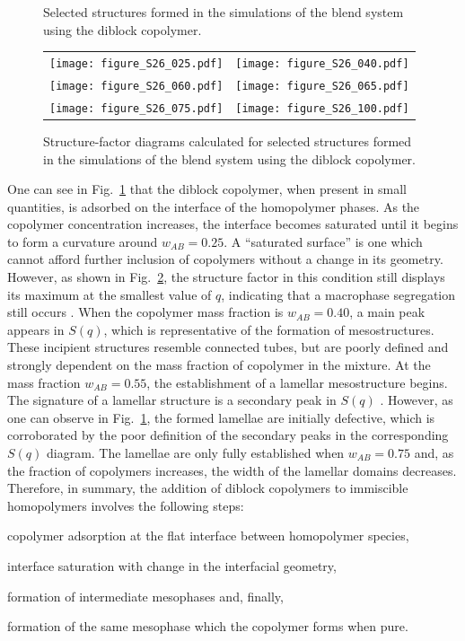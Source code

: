 \documentclass[
aip,
jcp,
reprint,
]{revtex4-1}
\begin{document}
\begin{figure}
\begin{tabular}{C{1.6in}@{}C{1.6in}}
	\end{tabular}
	\caption{Selected structures formed in the simulations of the blend system using the  diblock copolymer.}
	\label{fig:Figure_2}
\end{figure}

\begin{figure}
	\centering
	\begin{tabular}{C{1.6in}@{}C{1.6in}}
		\texttt{[image: figure\_S26\_025.pdf]} & \texttt{[image: figure\_S26\_040.pdf]} \\
		\texttt{[image: figure\_S26\_060.pdf]} & \texttt{[image: figure\_S26\_065.pdf]} \\		\texttt{[image: figure\_S26\_075.pdf]} & \texttt{[image: figure\_S26\_100.pdf]} \\	
	\end{tabular}
	\caption{Structure-factor diagrams calculated for selected structures formed in the simulations of the blend system using the  diblock copolymer.}
	\label{fig:Figure_3}
\end{figure}

One can see in Fig.~\ref{fig:Figure_2} that the diblock copolymer, when present in small quantities, is adsorbed on the interface of the homopolymer phases.
As the copolymer concentration increases, the interface becomes saturated until it begins to form a curvature around $w_{AB}=0.25$.
A ``saturated surface'' is one which cannot afford further inclusion of copolymers without a change in its geometry.
However, as shown in Fig.~\ref{fig:Figure_3}, the structure factor in this condition still displays its maximum at the smallest value of $q$, indicating that a macrophase segregation still occurs \cite{Gavrilov_2013, Lemos_2020}.
When the copolymer mass fraction is $w_{AB}=0.40$, a main peak appears in $S(q)$, which is representative of the formation of mesostructures.
These incipient structures resemble connected tubes, but are poorly defined and strongly dependent on the mass fraction of copolymer in the mixture. 
At the mass fraction $w_{AB}=0.55$, the establishment of a lamellar mesostructure begins.
The signature of a lamellar structure is a secondary peak in $S(q)$ \cite{Gavrilov_2013, Lemos_2020}.
However, as one can observe in Fig.~\ref{fig:Figure_2}, the formed lamellae are initially defective, which is corroborated by the poor definition of the secondary peaks in the corresponding $S(q)$ diagram.
The lamellae are only fully established when $w_{AB}=0.75$ and, as the fraction of copolymers increases, the width of the lamellar domains decreases.
Therefore, in summary, the addition of diblock copolymers to immiscible homopolymers involves the following steps: \begin{enumerate*}[label=\roman*)] \item copolymer adsorption at the flat interface between homopolymer species, \item interface saturation with change in the interfacial geometry, \item formation of intermediate mesophases and, finally, \item formation of the same mesophase which the copolymer forms when pure.\end{enumerate*}
\end{document}
